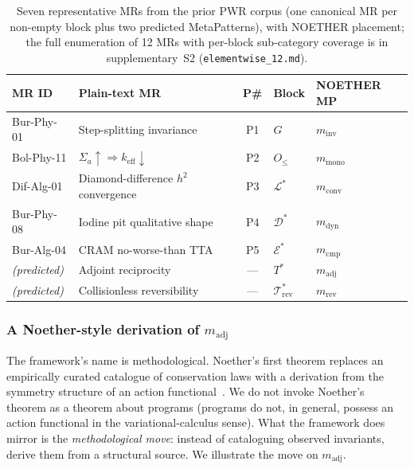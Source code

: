 \documentclass[manuscript]{acmart}
\begin{document}
\begin{table}[h]
\centering
\caption{Seven representative MRs from the prior PWR corpus (one canonical MR per non-empty block plus two predicted MetaPatterns), with NOETHER placement; the full enumeration of 12 MRs with per-block sub-category coverage is in supplementary~S2 (\texttt{elementwise\_12.md}).}
\label{tab:elementwise}
\footnotesize
\begin{tabular}{llcll}
\toprule
\textbf{MR ID} & \textbf{Plain-text MR} & \textbf{P\#} & \textbf{Block} & \textbf{NOETHER MP} \\
\midrule
Bur-Phy-01 & Step-splitting invariance & P1 & $G$ & $m_{\mathrm{inv}}$ \\
Bol-Phy-11 & $\Sigma_a\!\uparrow \Rightarrow k_{\mathrm{eff}}\!\downarrow$ & P2 & $O_{\le}$ & $m_{\mathrm{mono}}$ \\
Dif-Alg-01 & Diamond-difference $h^2$ convergence & P3 & $\mathcal{L}^{*}$ & $m_{\mathrm{conv}}$ \\
Bur-Phy-08 & Iodine pit qualitative shape & P4 & $\mathcal{D}^{*}$ & $m_{\mathrm{dyn}}$ \\
Bur-Alg-04 & CRAM no-worse-than TTA & P5 & $\mathcal{E}^{*}$ & $m_{\mathrm{cmp}}$ \\
\textit{(predicted)} & Adjoint reciprocity & --- & $T^{*}$ & $m_{\mathrm{adj}}$ \\
\textit{(predicted)} & Collisionless reversibility & --- & $\mathcal{T}^{*}_{\mathrm{rev}}$ & $m_{\mathrm{rev}}$ \\
\bottomrule
\end{tabular}
\end{table}

\subsubsection{A Noether-style derivation of \texorpdfstring{$m_{\mathrm{adj}}$}{m\_adj}}
\label{subsec:noether-mAdj}

The framework's name is methodological. Noether's first theorem replaces an empirically curated catalogue of conservation laws with a derivation from the symmetry structure of an action functional~\cite{Noether1918}. We do not invoke Noether's theorem as a theorem about programs (programs do not, in general, possess an action functional in the variational-calculus sense). What the framework does mirror is the \emph{methodological move}: instead of cataloguing observed invariants, derive them from a structural source. We illustrate the move on $m_{\mathrm{adj}}$.
\end{document}
